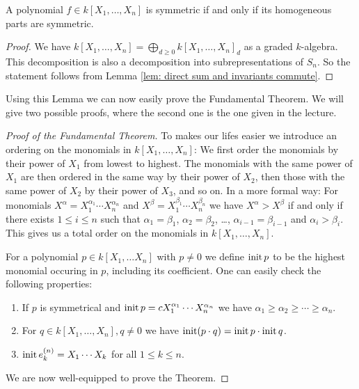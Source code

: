 \begin{lem}
 A polynomial $f \in k[X_1, \dotsc, X_n]$ is symmetric if and only if its homogeneous parts are symmetric.
\end{lem}
\begin{proof}
 We have $k[X_1, \dotsc, X_n] = \bigoplus_{d \geq 0} k[X_1, \dotsc, X_n]_d$ as a graded $k$-algebra. This decomposition is also a decomposition into subrepresentations of $S_n$. So the statement follows from Lemma \ref{lem: direct sum and invariants commute}.
\end{proof}


Using this Lemma we can now easily prove the Fundamental Theorem. We will give two possible proofs, where the second one is the one given in the lecture.


\begin{proof}[Proof of the Fundamental Theorem]
To makes our lifes easier we introduce an ordering on the monomials in $k[X_1, \dotsc, X_n]$: We first order the monomials by their power of $X_1$ from lowest to highest. The monomials with the same power of $X_1$ are then ordered in the same way by their power of $X_2$, then those with the same power of $X_2$ by their power of $X_3$, and so on. In a more formal way: For monomials $X^\alpha = X_1^{\alpha_1} \dotsm X_n^{\alpha_n}$ and $X^\beta = X_1^{\beta_1} \dotsm X_n^{\beta_n}$ we have $X^\alpha > X^\beta$ if and only if there exists $1 \leq i \leq n$ such that $\alpha_1 = \beta_1$, $\alpha_2 = \beta_2$, \dots, $\alpha_{i-1} = \beta_{i-1}$ and $\alpha_i > \beta_i$. This gives us a total order on the monomials in $k[X_1, \dotsc, X_n]$.
 
 For a polynomial $p \in k[X_1, \dotsc X_n]$ with $p \neq 0$ we define $\operatorname{init} p$ to be the highest monomial occuring in $p$, including its coefficient. One can easily check the following properties:
 \begin{enumerate}[label=\emph{\alph*)},leftmargin=*]
  \item
   If $p$ is symmetrical and $\operatorname{init} p = c X_1^{\alpha_1} \dotsm X_n^{\alpha_n}$ we have $\alpha_1 \geq \alpha_2 \geq \dotsb \geq \alpha_n$.
  \item
   For $q \in k[X_1, \dotsc, X_n], q \neq 0$ we have $\operatorname{init} (p \cdot q) = \operatorname{init} p \cdot \operatorname{init} q$.
  \item
   $\operatorname{init} e^{(n)}_k = X_1 \dotsm X_k$ for all $1 \leq k \leq n$.
 \end{enumerate}
 We are now well-equipped to prove the Theorem. 
 

\end{proof}
